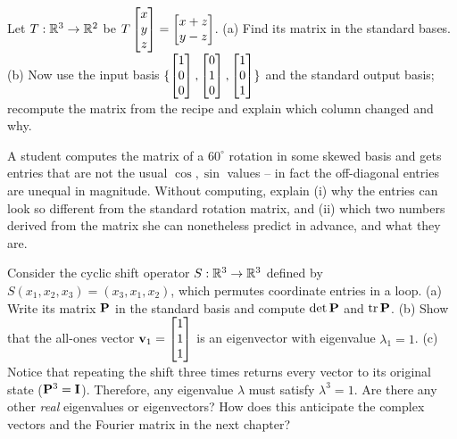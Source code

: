 \begin{exercise}
\label{ch31:ex-rect}
Let $T:\mathbb{R}^3\to\mathbb{R}^2$ be $T\begin{bmatrix}x\\y\\z\end{bmatrix}=\begin{bmatrix}x+z\\y-z\end{bmatrix}$. (a) Find its matrix
in the standard bases. (b) Now use the input basis
$\{\begin{bmatrix}1\\0\\0\end{bmatrix},\begin{bmatrix}0\\1\\0\end{bmatrix},\begin{bmatrix}1\\0\\1\end{bmatrix}\}$ and the standard output
basis; recompute the matrix from the recipe and explain which column changed and
why.
\end{exercise}

\begin{exercise}
\label{ch31:ex-conceptual}
A student computes the matrix of a $60^\circ$ rotation in some skewed basis and
gets entries that are not the usual $\cos,\sin$ values -- in fact the off-diagonal
entries are unequal in magnitude. Without computing, explain (i) why the entries
can look so different from the standard rotation matrix, and (ii) which two numbers
derived from the matrix she can nonetheless predict in advance, and what they are.
\end{exercise}

\begin{exercise}
\label{ch31:ex-fourier-preview}
Consider the cyclic shift operator $S:\mathbb{R}^3\to\mathbb{R}^3$ defined by $S(x_1, x_2, x_3) = (x_3, x_1, x_2)$, which permutes coordinate entries in a loop.
(a) Write its matrix $\mathbf{P}$ in the standard basis and compute $\det\mathbf{P}$ and $\operatorname{tr}\mathbf{P}$.
(b) Show that the all-ones vector $\mathbf{v}_1 = \begin{bmatrix}1\\1\\1\end{bmatrix}$ is an eigenvector with eigenvalue $\lambda_1 = 1$.
(c) Notice that repeating the shift three times returns every vector to its original state ($\mathbf{P}^3 = \mathbf{I}$). Therefore, any eigenvalue $\lambda$ must satisfy $\lambda^3 = 1$. Are there any other \emph{real} eigenvalues or eigenvectors? How does this anticipate the complex vectors and the Fourier matrix in the next chapter?
\end{exercise}
